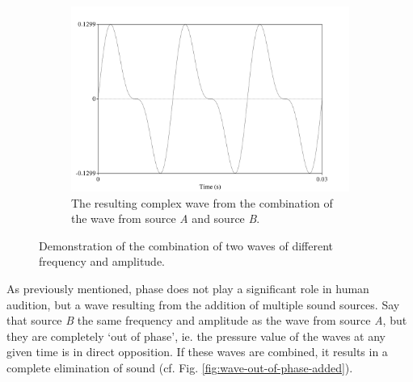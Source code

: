 \begin{figure}[h!]
\begin{center}
\begin{subfigure}{0.5\textwidth}
  \includegraphics[width=\textwidth]{figure/sound-wave-addition-combined.png}
  \caption{The resulting complex wave from the combination of the wave from source \textit{A} and source \textit{B}.}
  \label{fig:sound-wave-addition-combined}
\end{subfigure}
\end{center}
\caption{Demonstration of the combination of two waves of different frequency and amplitude.}
\label{fig:sound-wave-addition}
\end{figure}

As previously mentioned, phase does not play a significant role in human audition, but \DIFdelbegin {}\DIFdelend \DIFaddbegin {}\DIFaddend a wave resulting from the addition of multiple sound sources.  Say that source \textit{B} \DIFdelbegin {}\DIFdelend \DIFaddbegin {}\DIFaddend the same frequency and amplitude as the wave from source \textit{A}, but they are completely `out of phase', ie. the pressure value of the waves at any given time is in direct opposition\DIFdelbegin {}\DIFdelend .  If these waves are combined, it results in a complete elimination of sound (cf. Fig. \ref{fig:wave-out-of-phase-added}).

